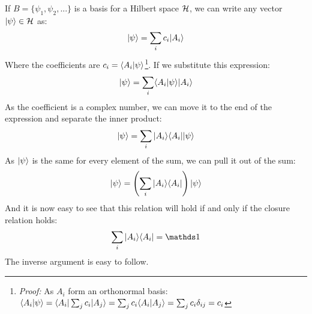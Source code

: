 If $B = \{\psi_1, \psi_2, ...\}$ is a basis for a Hilbert space $\mathcal{H}$, we can write any vector $|\psi\rangle\in\mathcal{H}$ as:
\begin{equation}
    |\psi\rangle = \sum_i c_i|A_i\rangle
\end{equation}
Where the coefficients are $c_i = \langle A_i|\psi\rangle$\footnote{\textit{Proof:} As $A_i$ form an orthonormal basis: $\langle A_i|\psi\rangle = \langle A_i|\sum_jc_i|A_j\rangle = \sum_jc_i\langle A_i|A_j\rangle = \sum_jc_i\delta_{ij} = c_i$}. If we substitute this expression:
\begin{equation}
    |\psi\rangle = \sum_i \langle A_i|\psi\rangle|A_i\rangle
\end{equation}
As the coefficient is a complex number, we can move it to the end of the expression and separate the inner product:
\begin{equation}
    |\psi\rangle = \sum_i |A_i\rangle\langle A_i||\psi\rangle
\end{equation}
As $|\psi\rangle$ is the same for every element of the sum, we can pull it out of the sum:
\begin{equation}
    |\psi\rangle = \left(\sum_i |A_i\rangle\langle A_i|\right)|\psi\rangle
\end{equation}
And it is now easy to see that this relation will hold if and only if the closure relation holds:
\begin{equation}
    \sum_i \ket{A_i}\bra{A_i} = \Imat
\end{equation}
The inverse argument is easy to follow.
